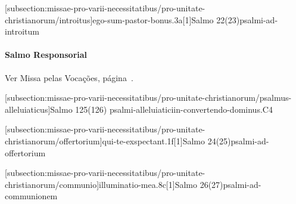 \def\Prefix{subsection:missae-pro-varii-necessitatibus/pro-unitate-christianorum}

[\Prefix/introitus]{ego-sum-pastor-bonus.3a}[1]{Salmo 22(23)}{psalmi-ad-introitum}

\paragraph{Salmo Responsorial}
\begin{rubrica}
  Ver Missa pelas Vocações, página~\pageref{subsection:missae-pro-varii-necessitatibus/pro-vocationibus/psalmus-responsorius}.
\end{rubrica}

[\Prefix/psalmus-alleluiaticus]{Salmo 125(126)}
{psalmi-alleluiatici}{in-convertendo-dominus.C4}

\AllowPageFlush

[\Prefix/offertorium]{qui-te-exspectant.1f}[1]{Salmo 24(25)}{psalmi-ad-offertorium}

\AllowPageFlush

[\Prefix/communio]{illuminatio-mea.8c}[1]{Salmo 26(27)}{psalmi-ad-communionem}